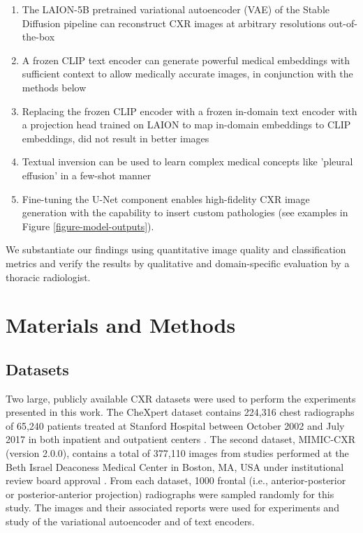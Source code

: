 \documentclass{article}
\begin{document}
\begin{enumerate}
    \item The LAION-5B pretrained variational autoencoder (VAE) of the Stable Diffusion pipeline can reconstruct CXR images at arbitrary resolutions out-of-the-box
    \item A frozen CLIP text encoder can generate powerful medical embeddings with sufficient context to allow medically accurate images, in conjunction with the methods below
    \item Replacing the frozen CLIP encoder with a frozen in-domain text encoder with a projection head trained on LAION to map in-domain embeddings to CLIP embeddings, did not result in better images
    \item Textual inversion can be used to learn complex medical concepts like 'pleural effusion' in a few-shot manner
    \item Fine-tuning the U-Net component enables high-fidelity CXR image generation with the capability to insert custom pathologies (see examples in Figure \ref{figure-model-outputs}).
\end{enumerate}

We substantiate our findings using quantitative image quality and classification metrics and verify the results by qualitative and domain-specific evaluation by a thoracic radiologist.

\section{Materials and Methods}
\label{materials-methods}

\subsection{Datasets}
\label{section-datasets}

Two large, publicly available CXR datasets were used to perform the experiments presented in this work. The CheXpert dataset contains 224,316 chest radiographs of 65,240 patients treated at Stanford Hospital between October 2002 and July 2017 in both inpatient and outpatient centers \citep{irvin2019chexpert}. The second dataset, MIMIC-CXR (version 2.0.0), contains a total of 377,110 images from studies performed at the Beth Israel Deaconess Medical Center in Boston, MA, USA under institutional review board approval \citep{Johnson2019}. From each dataset, 1000 frontal (i.e., anterior-posterior or posterior-anterior projection) radiographs were sampled randomly for this study. The images and their associated reports were used for experiments and study of the variational autoencoder and of text encoders. 
\end{document}
